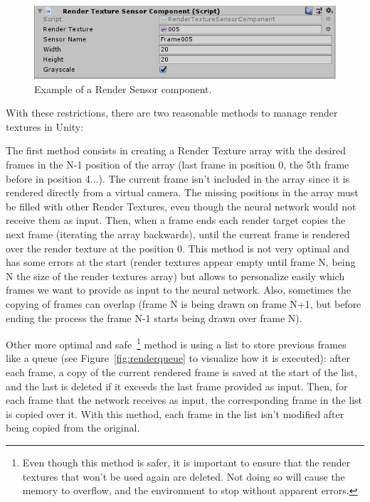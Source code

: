 \begin{figure}[h]
  \centering
		\includegraphics[width=.6\textwidth]{img/rendersensor.png}
  \caption{Example of a Render Sensor component.}
  \label{fig:rendersens}
\end{figure}

With these restrictions, there are two reasonable methods to manage render textures in Unity:

The first method consists in creating a Render Texture array with the desired frames in the N-1 position of the array (last frame in position 0, the 5th frame before in position 4...). The current frame isn't included in the array since it is rendered directly from a virtual camera. The missing positions in the array must be filled with other Render Textures, even though the neural network would not receive them as input. Then, when a frame ends each render target copies the next frame (iterating the array backwards), until the current frame is rendered over the render texture at the position 0.
This method is not very optimal and has some errors at the start (render textures appear empty until frame N, being N the size of the render textures array) but allows to personalize easily which frames we want to provide as input to the neural network. Also, sometimes the copying of frames can overlap (frame N is being drawn on frame N+1, but before ending the process the frame N-1 starts being drawn over frame N).

Other more optimal and safe~\footnote{Even though this method is safer, it is important to ensure that the render textures that won't be used again are deleted. Not doing so will cause the memory to overflow, and the environment to stop without apparent errors.} method is using a list to store previous frames like a queue (see Figure~\ref{fig:renderqueue} to visualize how it is executed): after each frame, a copy of the current rendered frame is saved at the start of the list, and the last is deleted if it exceeds the last frame provided as input. Then, for each frame that the network receives as input, the corresponding frame in the list is copied over it. With this method, each frame in the list isn't modified after being copied from the original.


